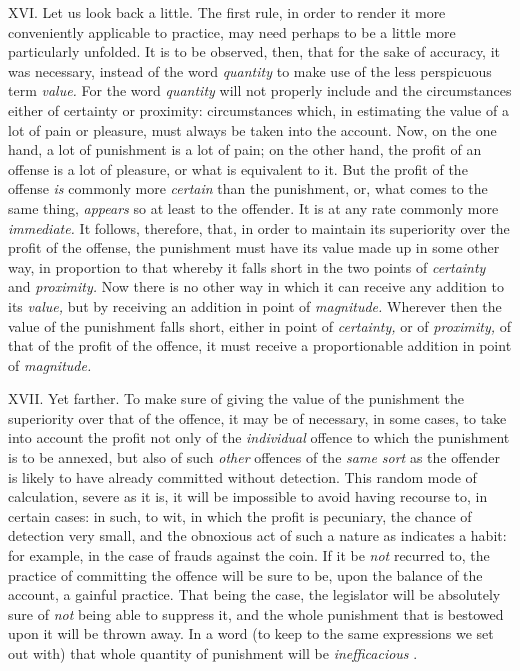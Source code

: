 \documentclass[12pt]{report}
\begin{document}
XVI. Let us look back a little. The first rule, in order to render it
more conveniently applicable to practice, may need perhaps to be a
little more particularly unfolded. It is to be observed, then, that for
the sake of accuracy, it was necessary, instead of the word
\emph{quantity} to make use of the less perspicuous term \emph{value.}
For the word \emph{quantity} will not properly include and the
circumstances either of certainty or proximity: circumstances which, in
estimating the value of a lot of pain or pleasure, must always be taken
into the account. Now, on the one hand, a lot of punishment is a lot of
pain; on the other hand, the profit of an offense is a lot of pleasure,
or what is equivalent to it. But the profit of the offense \emph{is}
commonly more \emph{certain} than the punishment, or, what comes to the
same thing, \emph{appears} so at least to the offender. It is at any
rate commonly more \emph{immediate.} It follows, therefore, that, in
order to maintain its superiority over the profit of the offense, the
punishment must have its value made up in some other way, in proportion
to that whereby it falls short in the two points of \emph{certainty} and
\emph{proximity.} Now there is no other way in which it can receive any
addition to its \emph{value,} but by receiving an addition in point of
\emph{magnitude.} Wherever then the value of the punishment falls short,
either in point of \emph{certainty,} or of \emph{proximity,} of that of
the profit of the offence, it must receive a proportionable addition in
point of \emph{magnitude.}

XVII. Yet farther. To make sure of giving the value of the punishment
the superiority over that of the offence, it may be of necessary, in
some cases, to take into account the profit not only of the
\emph{individual} offence to which the punishment is to be annexed, but
also of such \emph{other} offences of the \emph{same sort} as the
offender is likely to have already committed without detection. This
random mode of calculation, severe as it is, it will be impossible to
avoid having recourse to, in certain cases: in such, to wit, in which
the profit is pecuniary, the chance of detection very small, and the
obnoxious act of such a nature as indicates a habit: for example, in the
case of frauds against the coin. If it be \emph{not} recurred to, the
practice of committing the offence will be sure to be, upon the balance
of the account, a gainful practice. That being the case, the legislator
will be absolutely sure of \emph{not} being able to suppress it, and the
whole punishment that is bestowed upon it will be thrown away. In a word
(to keep to the same expressions we set out with) that whole quantity of
punishment will be \emph{inefficacious} .
\end{document}
